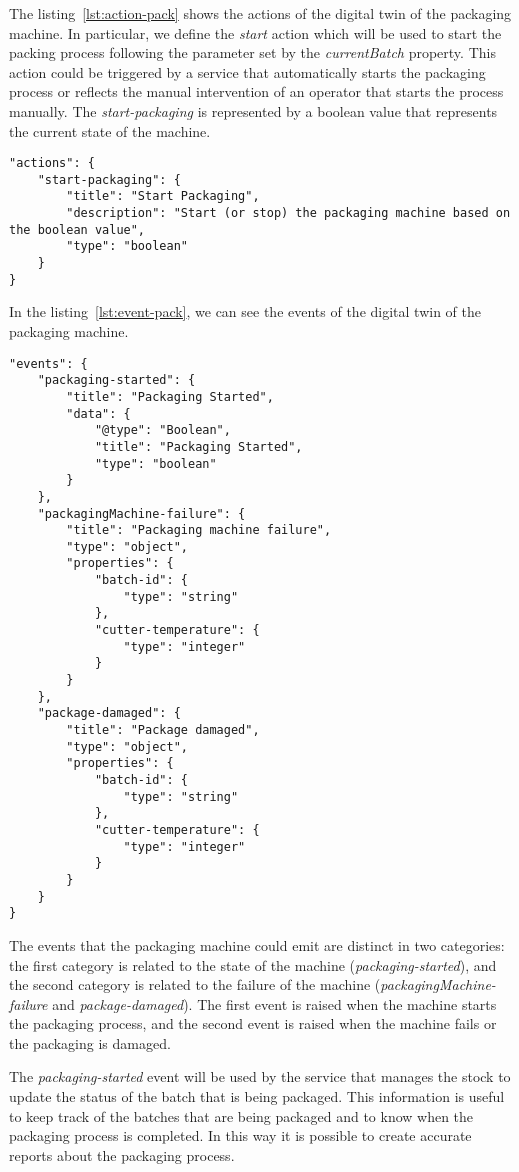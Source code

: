 The listing~\ref{lst:action-pack} shows the actions of the digital twin of the packaging machine. In particular, we define the \textit{start} action
which will be used to start the packing process following the parameter set by the \textit{currentBatch} property.
This action could be triggered by a service that automatically starts the packaging process or reflects the manual intervention of an operator that starts the process manually.
The \textit{start-packaging} is represented by a boolean value that represents the current state of the machine.

\begin{lstlisting}[caption={Actions of the packaging machine Thing Model.},label={lst:action-pack}]
"actions": {
	"start-packaging": {
		"title": "Start Packaging",
		"description": "Start (or stop) the packaging machine based on the boolean value",
		"type": "boolean"
	}
}
\end{lstlisting}

In the listing~\ref{lst:event-pack}, we can see the events of the digital twin of the packaging machine.

\begin{lstlisting}[caption={Events of the packaging machine Thing Model.},label={lst:event-pack}]
"events": {
	"packaging-started": {
		"title": "Packaging Started",
		"data": {
			"@type": "Boolean",
			"title": "Packaging Started",
			"type": "boolean"
		}
	},
	"packagingMachine-failure": {
		"title": "Packaging machine failure",
		"type": "object",
		"properties": {
			"batch-id": {
				"type": "string"
			},
			"cutter-temperature": {
				"type": "integer"
			}
		}
	},
	"package-damaged": {
		"title": "Package damaged",
		"type": "object",
		"properties": {
			"batch-id": {
				"type": "string"
			},
			"cutter-temperature": {
				"type": "integer"
			}
		}
	}
}
\end{lstlisting}

The events that the packaging machine could emit are distinct in two categories: the first category is related to the state of the machine (\textit{packaging-started}), and the second category is related to the failure of the machine (\textit{packagingMachine-failure} and \textit{package-damaged}). The first event is raised when the machine starts the packaging process, and the second event is raised when the machine fails or the packaging is damaged.

The \textit{packaging-started} event will be used by the service that manages the stock to update the status of the batch that is being packaged.
This information is useful to keep track of the batches that are being packaged and to know when the packaging process is completed. In this way it
is possible to create accurate reports about the packaging process.

